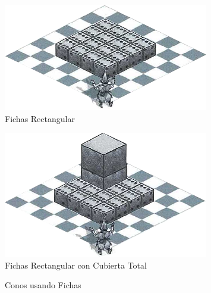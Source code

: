 \documentclass[a4paper,twocolumn,openany,10pt]{dndbook}
\begin{document}
\begin{figure}[hbtp]
	\centering
	\includegraphics[scale=1]{img/CuadradoToken.png}
	\caption{Fichas Rectangular}
	\label{img:token_rec}
\end{figure}

\begin{figure}[hbtp]
	\centering
	\includegraphics[scale=1]{img/CuadradoTotalToken.png}
	\caption{Fichas Rectangular con Cubierta Total}
	\label{img:token_rec_total}
\end{figure}
 
\begin{figure}[htp]
	\centering
	\caption{Conos usando Fichas}
	\label{img:token_cono}
\end{figure}
\end{document}
